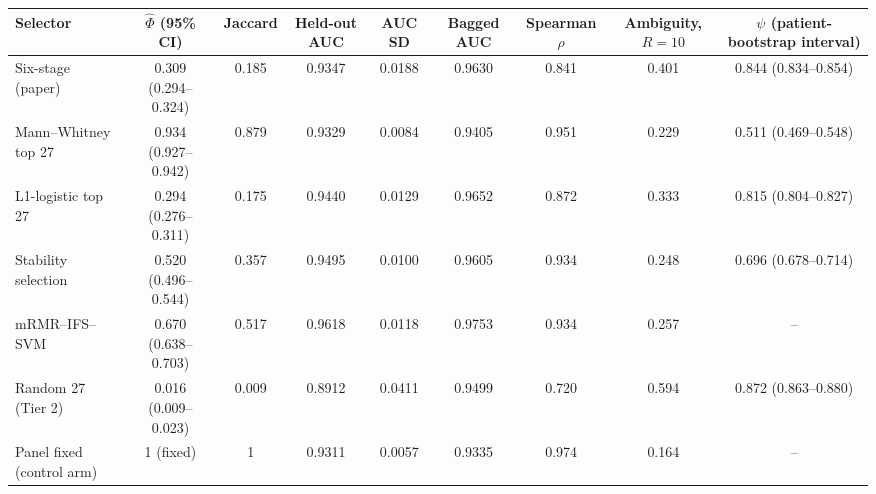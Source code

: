 \begin{tabular}{lcccccccc}
\toprule
Selector & $\hat\Phi$ (95\% CI) & Jaccard & Held-out AUC & AUC SD & Bagged AUC & Spearman $\rho$ & Ambiguity, $R=10$ & $\psi$ (patient-bootstrap interval) \\
\midrule
Six-stage (paper) & 0.309 (0.294--0.324) & 0.185 & 0.9347 & 0.0188 & 0.9630 & 0.841 & 0.401 & 0.844 (0.834--0.854) \\
Mann--Whitney top 27 & 0.934 (0.927--0.942) & 0.879 & 0.9329 & 0.0084 & 0.9405 & 0.951 & 0.229 & 0.511 (0.469--0.548) \\
L1-logistic top 27 & 0.294 (0.276--0.311) & 0.175 & 0.9440 & 0.0129 & 0.9652 & 0.872 & 0.333 & 0.815 (0.804--0.827) \\
Stability selection & 0.520 (0.496--0.544) & 0.357 & 0.9495 & 0.0100 & 0.9605 & 0.934 & 0.248 & 0.696 (0.678--0.714) \\
mRMR--IFS--SVM & 0.670 (0.638--0.703) & 0.517 & 0.9618 & 0.0118 & 0.9753 & 0.934 & 0.257 & -- \\
Random 27 (Tier 2) & 0.016 (0.009--0.023) & 0.009 & 0.8912 & 0.0411 & 0.9499 & 0.720 & 0.594 & 0.872 (0.863--0.880) \\
Panel fixed (control arm) & 1 (fixed) & 1 & 0.9311 & 0.0057 & 0.9335 & 0.974 & 0.164 & -- \\
\bottomrule
\end{tabular}
